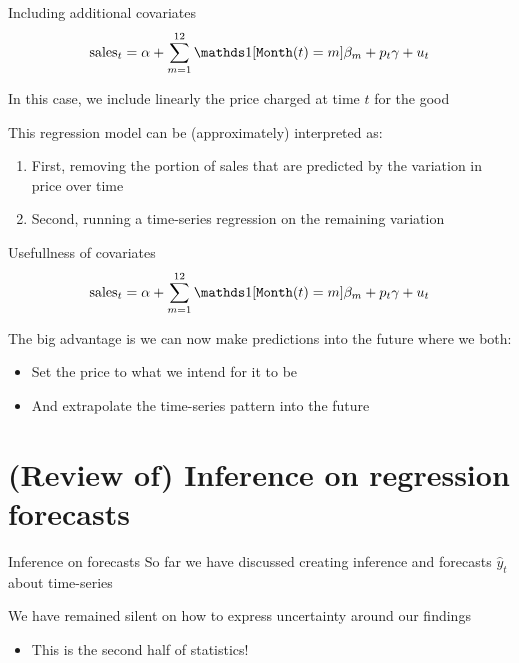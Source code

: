 \documentclass[aspectratio=169,t,11pt,table]{beamer}
\begin{document}
\begin{frame}{Including additional covariates}
  \vspace*{-\bigskipamount}
  $$
    \text{sales}_t = \alpha + \sum_{m = 1}^{12} \one{\texttt{Month}(t) = m} \beta_m + p_t \gamma + u_t
  $$

  In this case, we include linearly the price charged at time $t$ for the good

  \pause
  \bigskip
  This regression model can be (approximately) interpreted as:
  \begin{enumerate}
    \item First, removing the portion of sales that are predicted by the variation in price over time
    
    \item Second, running a time-series regression on the remaining variation
  \end{enumerate}
\end{frame}

\begin{frame}{Usefullness of covariates}
  \vspace*{-\bigskipamount}
  $$
    \text{sales}_t = \alpha + \sum_{m = 1}^{12} \one{\texttt{Month}(t) = m} \beta_m + p_t \gamma + u_t
  $$

  The big advantage is we can now make predictions into the future where we both:
  \begin{itemize}
    \item Set the price to what we intend for it to be
    \item And extrapolate the time-series pattern into the future
  \end{itemize}  
\end{frame}


\section{(Review of) Inference on regression forecasts}

\begin{frame}{Inference on forecasts}
  So far we have discussed creating inference and forecasts $\hat{y}_t$ about time-series

  \bigskip
  We have remained silent on how to express uncertainty around our findings
  \begin{itemize}
    \item This is the second half of statistics!
  \end{itemize}
\end{frame}
\end{document}
